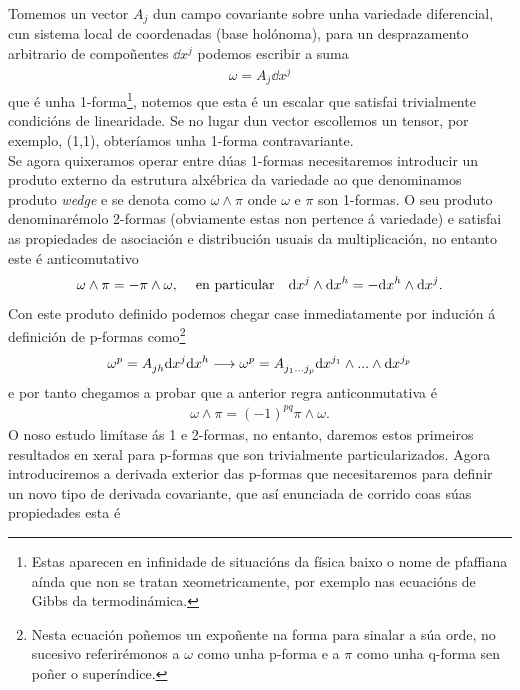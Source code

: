 Tomemos un vector $A_j$ dun campo covariante sobre unha variedade diferencial, cun sistema local de coordenadas (base holónoma), para un desprazamento arbitrario de compoñentes $\dd x^j$ podemos escribir a suma
\begin{align}
    \omega = A_j\dd x^j
\end{align}
que é unha 1-forma\footnote{Estas aparecen en infinidade de situacións da física baixo o nome de pfaffiana aínda que non se tratan xeometricamente, por exemplo nas ecuacións de Gibbs da termodinámica.}, notemos que esta é un escalar que satisfai trivialmente condicións de linearidade. Se no lugar dun vector escollemos un tensor, por exemplo, (1,1), obteríamos unha 1-forma contravariante.\\
Se agora quixeramos operar entre dúas 1-formas necesitaremos introducir un produto externo da estrutura alxébrica da variedade ao que denominamos produto \textit{wedge} e se denota como $\omega\wedge\pi$ onde $\omega$ e $\pi$ son 1-formas. O seu produto denominarémolo 2-formas (obviamente estas non pertence á variedade) e satisfai as propiedades de asociación e distribución usuais da multiplicación, no entanto este é anticomutativo
\begin{align}
    \omega\wedge\pi = -\pi\wedge\omega,\hspace{1.2em}\text{en particular} \hspace{1em} \text{d} x^j\wedge\text{d} x^h = - \text{d} x^h\wedge\text{d} x^j .
\end{align}
Con este produto definido podemos chegar case inmediatamente por indución á definición de p-formas como\footnote{Nesta ecuación poñemos un expoñente na forma para sinalar a súa orde, no sucesivo referirémonos a $\omega$ como unha p-forma e a $\pi$ como unha q-forma sen poñer o superíndice.}
\begin{align}
    \omega^p = A\indices{_j_h}\dd x^j\dd x^h\longrightarrow \omega^p = A\indices{_{j_1}_{...}_{j_p}}\dd x^{j_1}\wedge ... \wedge \dd x^{j_p}
\end{align}
e por tanto chegamos a probar que a anterior regra anticonmutativa é 
\begin{align}
    \omega\wedge\pi = (-1)^{pq}\pi\wedge\omega .
\end{align}
O noso estudo limítase ás 1 e 2-formas, no entanto, daremos estos primeiros resultados en xeral para p-formas que son trivialmente particularizados. 
Agora introduciremos a derivada exterior das p-formas que necesitaremos para definir un novo tipo de derivada covariante, que así enunciada de corrido coas súas propiedades esta é
